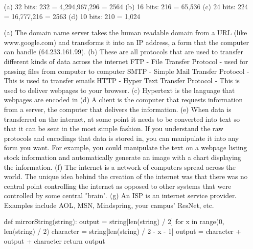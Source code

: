 \begin{exercises}
\begin{ex} %
(a) 32 bits: 232 = 4,294,967,296 = 2564
\newline
(b) 16 bits: 216 = 65,536
\newline
(c) 24 bits: 224 = 16,777,216 = 2563
\newline
(d) 10 bits: 210 = 1,024
\end{ex}

\begin{ex} %
(a)	The domain name server takes the human readable domain from a URL
(like www.google.com) and transforms it into an IP address, a form that the
computer can handle (64.233.161.99).
\newline
(b)	These are all protocols that are used to transfer different kinds
of data across the internet
\newline
FTP - File Transfer Protocol - used for passing files from computer to
computer
\newline
SMTP - Simple Mail Transfer Protocol - This is used to transfer emails
\newline
HTTP - Hyper Text Transfer Protocol - This is used to deliver webpages to
your browser.
\newline
(c)	Hypertext is the language that webpages are encoded in
\newline
(d)	A client is the computer that requests information from a server,
the computer that delivers the information.
\newline
(e)	When data is transferred on the internet, at some point it needs to
be converted into text so that it can be sent in the most simple fashion.
\newline
If you understand the raw protocols and encodings that data is stored in,
you can manipulate it into any form you want. For example, you could
manipulate the text on a webpage listing stock information and
automatically generate an image with a chart displaying the information.
\newline
(f)	The internet is a network of computers spread across the world. The
unique idea behind the creation of the internet was that there was no
central point controlling the internet as opposed to other systems that
were controlled by some central "brain".
\newline
(g)	An ISP is an internet service provider. Examples include AOL, MSN,
Mindspring, your campus' ResNet, etc.
\end{ex}

\begin{ex} %
\begin{example}
def mirrorString(string):
  output = string[len(string) / 2]
  for x in range(0, len(string) / 2)
    character = string[len(string) / 2 - x - 1]
    output = character + output + character
  return output
\end{example}
\end{ex}


\end{exercises}
